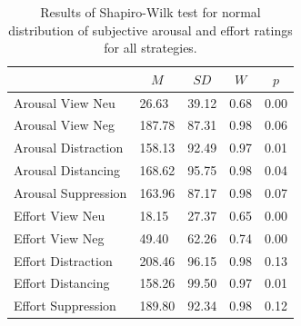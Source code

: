 \documentclass[
  man,floatsintext]{apa6}
\begin{document}
\begin{table}[H]

\begin{center}
\begin{threeparttable}

\caption{\label{tab:TabNV}Results of Shapiro-Wilk test for normal distribution of subjective arousal and effort ratings for all strategies.}

\begin{tabular}{lllll}
\toprule
 & \multicolumn{1}{c}{$M$} & \multicolumn{1}{c}{$SD$} & \multicolumn{1}{c}{$W$} & \multicolumn{1}{c}{$p$}\\
\midrule
Arousal View Neu & 26.63 & 39.12 & 0.68 & 0.00\\
Arousal View Neg & 187.78 & 87.31 & 0.98 & 0.06\\
Arousal Distraction & 158.13 & 92.49 & 0.97 & 0.01\\
Arousal Distancing & 168.62 & 95.75 & 0.98 & 0.04\\
Arousal Suppression & 163.96 & 87.17 & 0.98 & 0.07\\
Effort View Neu & 18.15 & 27.37 & 0.65 & 0.00\\
Effort View Neg & 49.40 & 62.26 & 0.74 & 0.00\\
Effort Distraction & 208.46 & 96.15 & 0.98 & 0.13\\
Effort Distancing & 158.26 & 99.50 & 0.97 & 0.01\\
Effort Suppression & 189.80 & 92.34 & 0.98 & 0.12\\
\bottomrule
\end{tabular}

\end{threeparttable}
\end{center}

\end{table}
\end{document}
